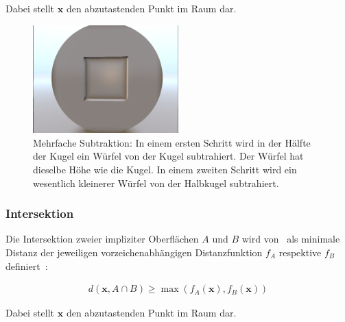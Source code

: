 Dabei stellt $\bm{x}$ den abzutastenden Punkt im Raum dar.

\begin{figure}[H]
    \centering
    \includegraphics[width=0.5\textwidth]{img/sphere_tracing_subtraction.pdf}
    \caption{Mehrfache Subtraktion: In einem ersten Schritt wird in der
        Hälfte der Kugel ein Würfel von der Kugel subtrahiert. Der Würfel
        hat dieselbe Höhe wie die Kugel. In einem zweiten Schritt wird ein
        wesentlich kleinerer Würfel von der Halbkugel
        subtrahiert.\protect\footnotemark}\label{
        fig:implicit_surfaces_ops_subtraction}
\end{figure}

\subsubsection{Intersektion}
\label{ssubsec:implicit_surfaces_ops_intersection}

Die Intersektion zweier impliziter Oberflächen $A$ und $B$ wird
von~\cite{hart_sphere_1994} als minimale Distanz der jeweiligen
vorzeichenabhängigen  Distanzfunktion $f_{A}$ respektive $f_{B}$
definiert~\parencite[S. 532]{hart_sphere_1994}:

\begin{gather}
    d(\bm{x}, A \cap B) \geq \max(f_{A}(\bm{x}), f_{B}(\bm{x}))
\end{gather}

Dabei stellt $\bm{x}$ den abzutastenden Punkt im Raum dar.
